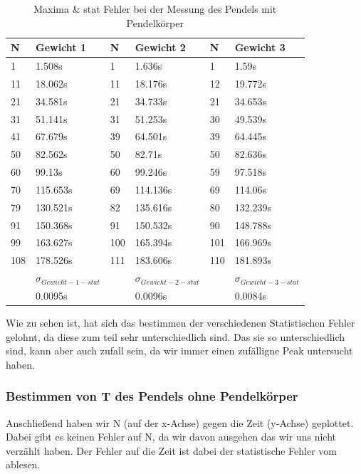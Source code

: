 \documentclass[twoside]{protokoll}
\begin{document}
\begin{table}[H]
    \centering
    \begin{tabularx}{1.0\textwidth}{X X X X X X}
       \textbf{N}  & \textbf{Gewicht 1} & \textbf{N} & \textbf{Gewicht 2} & \textbf{N} & \textbf{Gewicht 3} \\
       \toprule
       1 & 1.508s &  1 & 1.636s &  1 & 1.59s \\
       11 & 18.062s &  11 & 18.176s &  12 & 19.772s \\
       21 & 34.581s &  21 & 34.733s &  21 & 34.653s \\
       31 & 51.141s &  31 & 51.253s &  30 & 49.539s \\
       41 & 67.679s &  39 & 64.501s &  39 & 64.445s \\
       50 & 82.562s &  50 & 82.71s &  50 & 82.636s \\
       60 & 99.13s &  60 & 99.246s &  59 & 97.518s \\
       70 & 115.653s &  69 & 114.136s &  69 & 114.06s \\
       79 & 130.521s &  82 & 135.616s &  80 & 132.239s \\
       91 & 150.368s &  91 & 150.532s &  90 & 148.788s \\
       99 & 163.627s &  100 & 165.394s &  101 & 166.969s \\
       108 & 178.526s &  111 & 183.606s &  110 & 181.893s \\
       \midrule
        & \textbf{$\sigma_{Gewicht-1-stat}$} & & \textbf{$\sigma_{Gewicht-2-stat}$} & & \textbf{$\sigma_{Gewicht-3-stat}$} \\
       \midrule
        & 0.0095s & & 0.0096s & & 0.0084s \\
       \toprule
    \end{tabularx}
    \caption{Maxima \& stat Fehler bei der Messung des Pendels mit Pendelkörper}
\end{table}

Wie zu sehen ist, hat sich das bestimmen der verschiedenen Statistischen Fehler gelohnt, da diese zum teil sehr unterschiedlich sind.
Das sie so unterschiedlich sind, kann aber auch zufall sein, da wir immer einen zufälligne Peak untersucht haben.\\

\subsubsection{Bestimmen von T des Pendels ohne Pendelkörper}
Anschließend haben wir N (auf der x-Achse) gegen die Zeit (y-Achse) geplottet.
Dabei gibt es keinen Fehler auf N, da wir davon ausgehen das wir uns nicht verzählt haben.
Der Fehler auf die Zeit ist dabei der statistische Fehler vom ablesen.
\end{document}
